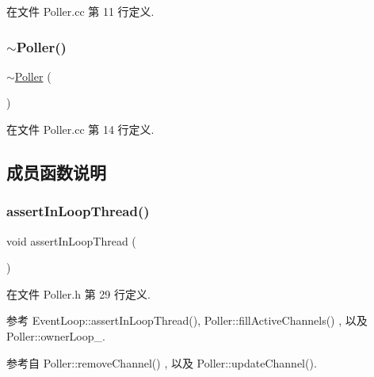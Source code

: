 在文件 Poller.\+cc 第 11 行定义.

\mbox{\label{classmuduo_1_1Poller_a057f5fb0e9594deb1fd4b46f0e930557}} 
\subsubsection{\texorpdfstring{$\sim$\+Poller()}{~Poller()}}
{\footnotesize\ttfamily $\sim$\hyperlink{classmuduo_1_1Poller}{Poller} (\begin{DoxyParamCaption}{ }\end{DoxyParamCaption})}



在文件 Poller.\+cc 第 14 行定义.



\subsection{成员函数说明}
\mbox{\label{classmuduo_1_1Poller_a9e9c23193ece3ba25a1a2779fc7ebc2d}} 
\subsubsection{\texorpdfstring{assert\+In\+Loop\+Thread()}{assertInLoopThread()}}
{\footnotesize\ttfamily void assert\+In\+Loop\+Thread (\begin{DoxyParamCaption}{ }\end{DoxyParamCaption})\hspace{0.3cm}{\ttfamily [inline]}}



在文件 Poller.\+h 第 29 行定义.



参考 Event\+Loop\+::assert\+In\+Loop\+Thread(), Poller\+::fill\+Active\+Channels() , 以及 Poller\+::owner\+Loop\+\_\+.



参考自 Poller\+::remove\+Channel() , 以及 Poller\+::update\+Channel().

